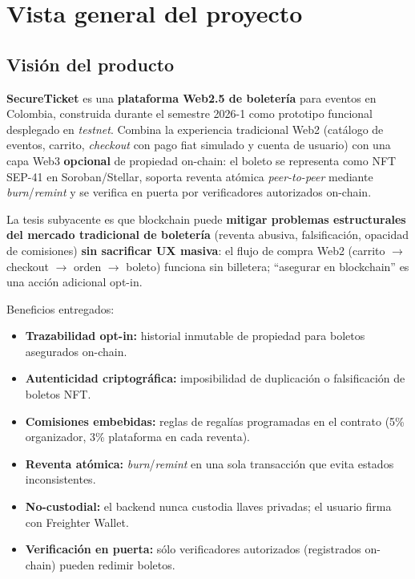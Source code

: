 \documentclass[12pt,oneside]{report}
\newcommand{\projectname}{SecureTicket}
\begin{document}

  \setcounter{section}{5}

  \section{Vista general del proyecto}
  \label{sec:vista-general}

    \subsection{Visión del producto}
    \label{subsec:vision}
    \textbf{\projectname} es una \textbf{plataforma Web2.5 de boletería} para eventos en Colombia, construida durante el semestre 2026-1 como prototipo funcional desplegado en \textit{testnet}. Combina la experiencia tradicional Web2 (catálogo de eventos, carrito, \textit{checkout} con pago fiat simulado y cuenta de usuario) con una capa Web3 \textbf{opcional} de propiedad on-chain: el boleto se representa como NFT SEP-41 en Soroban/Stellar, soporta reventa atómica \textit{peer-to-peer} mediante \textit{burn}/\textit{remint} y se verifica en puerta por verificadores autorizados on-chain.

    La tesis subyacente es que blockchain puede \textbf{mitigar problemas estructurales del mercado tradicional de boletería} (reventa abusiva, falsificación, opacidad de comisiones) \textbf{sin sacrificar UX masiva}: el flujo de compra Web2 (carrito $\rightarrow$ checkout $\rightarrow$ orden $\rightarrow$ boleto) funciona sin billetera; ``asegurar en blockchain'' es una acción adicional opt-in.

    Beneficios entregados:
    \begin{itemize}
      \item \textbf{Trazabilidad opt-in:} historial inmutable de propiedad para boletos asegurados on-chain.
      \item \textbf{Autenticidad criptográfica:} imposibilidad de duplicación o falsificación de boletos NFT.
      \item \textbf{Comisiones embebidas:} reglas de regalías programadas en el contrato (5\% organizador, 3\% plataforma en cada reventa).
      \item \textbf{Reventa atómica:} \textit{burn}/\textit{remint} en una sola transacción que evita estados inconsistentes.
      \item \textbf{No-custodial:} el backend nunca custodia llaves privadas; el usuario firma con Freighter Wallet.
      \item \textbf{Verificación en puerta:} sólo verificadores autorizados (registrados on-chain) pueden redimir boletos.
    \end{itemize}
\end{document}
